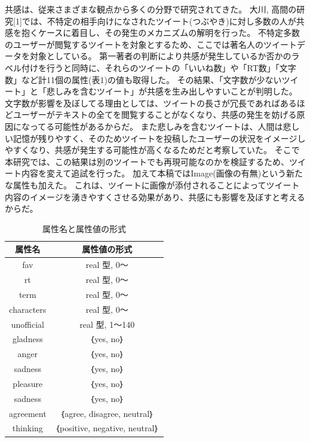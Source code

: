 \documentclass[dvipdfmx]{issj}
\begin{document}
共感は、従来さまざまな観点から多くの分野で研究されてきた。
大川, 高間の研究[1]では、不特定の相手向けになされたツイート(つぶやき)に対し多数の人が共感を抱くケースに着目し、その発生のメカニズムの解明を行った。
不特定多数のユーザーが閲覧するツイートを対象とするため、ここでは著名人のツイートデータを対象としている。
第一著者の判断により共感が発生しているか否かのラベル付けを行うと同時に、それらのツイートの「いいね数」や「RT数」「文字数」など計11個の属性(表1)の値も取得した。
その結果、「文字数が少ないツイート」と「悲しみを含むツイート」が共感を生み出しやすいことが判明した。
文字数が影響を及ぼしてる理由としては、ツイートの長さが冗長であればあるほどユーザーがテキストの全てを閲覧することがなくなり、共感の発生を妨げる原因になってる可能性があるからだ。
また悲しみを含むツイートは、人間は悲しい記憶が残りやすく、そのためツイートを投稿したユーザーの状況をイメージしやすくなり、共感が発生する可能性が高くなるためだと考察していた。
そこで本研究では、この結果は別のツイートでも再現可能なのかを検証するため、ツイート内容を変えて追試を行った。
加えて本稿ではImage(画像の有無)という新たな属性も加えた。
これは、ツイートに画像が添付されることによってツイート内容のイメージを湧きやすくさせる効果があり、共感にも影響を及ぼすと考えるからだ。



\begin{table}[htbp]\centering
\caption{属性名と属性値の形式}\label{tbl:font}
\begin{small}
\begin{tabular}{|c|c|} \hline
属性名            & 属性値の形式\\\hline\hline
fav & real 型, 0～\\\hline
rt  &  real 型, 0～\\\hline
term  & real 型, 0～\\\hline
characters         & real 型, 0～\\\hline
unofficial      &  real 型, 1～140\\\hline
gladness & ｛yes, no｝\\\hline
anger & ｛yes, no｝\\\hline
sadness & ｛yes, no｝\\\hline
pleasure & ｛yes, no｝\\\hline
sadness & ｛yes, no｝\\\hline
agreement & ｛agree, disagree, neutral｝\\\hline
thinking & ｛positive, negative, neutral｝\\\hline
\end{tabular}
\end{small}
\end{table}
\end{document}
